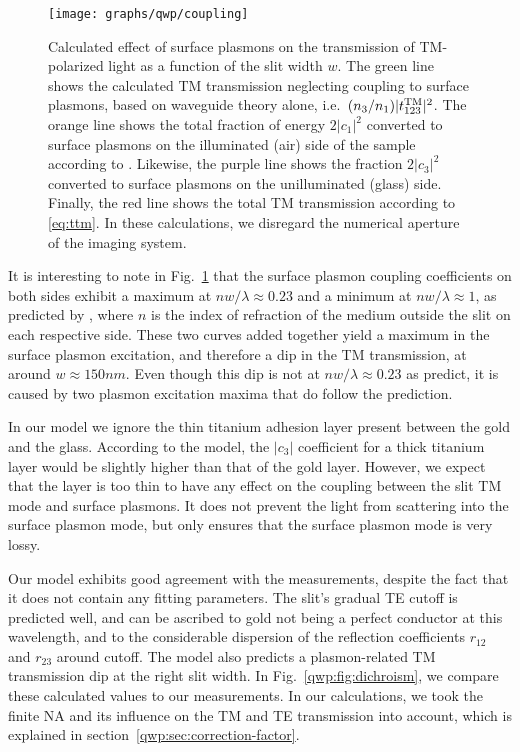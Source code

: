 \begin{figure}[tb]
\forceversofloat\centering
\texttt{[image: graphs/qwp/coupling]}
\caption{Calculated effect of surface plasmons on the transmission of \gls{TM}-polarized light as a function of the slit width $w$.
The green line shows the calculated \gls{TM} transmission neglecting coupling to surface plasmons, based on waveguide theory alone, i.e.\ $(n_3/n_1)|t_{123}^{\text{TM}}|^2$.
The orange line shows the total fraction of energy $2|c_1|^2$ converted to surface plasmons on the illuminated (air) side of the sample according to \textcite{Lalanne2006}.
Likewise, the purple line shows the fraction $2|c_3|^2$ converted to surface plasmons on the unilluminated (glass) side.
Finally, the red line shows the total \gls{TM} transmission according to \eqref{eq:ttm}.
In these calculations, we disregard the numerical aperture of the imaging system.}
\label{fig:sp-effect}
\end{figure}

It is interesting to note in Fig.~\ref{fig:sp-effect} that the surface plasmon coupling coefficients on both sides exhibit a maximum at $nw/\lambda\approx 0.23$ and a minimum at $nw/\lambda\approx 1$, as predicted by \citeauthor{Lalanne2006}\cite{Lalanne2006}, where $n$ is the index of refraction of the medium outside the slit on each respective side.
These two curves added together yield a maximum in the surface plasmon excitation, and therefore a dip in the \gls{TM} transmission, at around $w\approx 150\unit{nm}$.
Even though this dip is not at $nw/\lambda\approx 0.23$ as \citeauthor{Lalanne2006} predict, it is caused by two plasmon excitation maxima that do follow the prediction.

In our model we ignore the thin titanium adhesion layer present between the gold and the glass.
According to the model, the $|c_3|$ coefficient for a thick titanium layer would be slightly higher than that of the gold layer.
However, we expect that the layer is too thin to have any effect on the coupling between the slit \gls{TM} mode and surface plasmons.
It does not prevent the light from scattering into the surface plasmon mode, but only ensures that the surface plasmon mode is very lossy.

Our model exhibits good agreement with the measurements, despite the fact that it does not contain any fitting parameters.
The slit's gradual \gls{TE} cutoff is predicted well, and can be ascribed to gold not being a perfect conductor at this wavelength, and to the considerable dispersion of the reflection coefficients $r_{12}$ and $r_{23}$ around cutoff.
The model also predicts a plasmon-related \gls{TM} transmission dip at the right slit width.
In Fig.~\ref{qwp:fig:dichroism}, we compare these calculated values to our measurements.
In our calculations, we took the finite \gls{NA} and its influence on the \gls{TM} and \gls{TE} transmission into account, which is explained in section~\ref{qwp:sec:correction-factor}.

